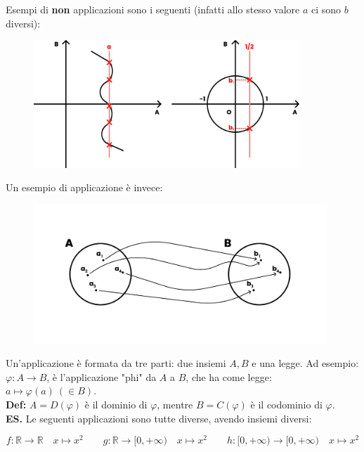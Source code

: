 \documentclass{article}
\begin{document}
\noindent Esempi di \textbf{non} applicazioni sono i seguenti (infatti allo stesso valore $a$ ci sono $b$ diversi):

\begin{figure}[h!]
    \centering
    \includegraphics[width=10cm]{./images/notApplication.pdf}
\end{figure}

\noindent Un esempio di applicazione è invece:

\begin{figure}[h!]
    \centering
    \includegraphics[width=11cm]{./images/application.pdf}
\end{figure}

\noindent Un'applicazione è formata da tre parti: due insiemi $A, B$ e una legge. Ad esempio: $\varphi: A \xrightarrow{} B$, è l'applicazione "phi" da $A$ a $B$, che ha come legge: $a \longmapsto \varphi(a) \ (\in B)$.\\

\noindent \textbf{Def:} $A = D(\varphi)$ è il dominio di $\varphi$, mentre $B = C(\varphi)$ è il codominio di $\varphi$.\\

\noindent \textbf{ES.} Le seguenti applicazioni sono tutte diverse, avendo insiemi diversi: 

\begin{equation*}
    f: \mathbb{R} \xrightarrow{} \mathbb{R} \quad x \longmapsto x^2 \qquad g: \mathbb{R} \xrightarrow{} [0, +\infty) \quad x \longmapsto x^2 \qquad h: [0, +\infty) \xrightarrow{} [0, +\infty) \quad x \longmapsto x^2
\end{equation*}
\end{document}
